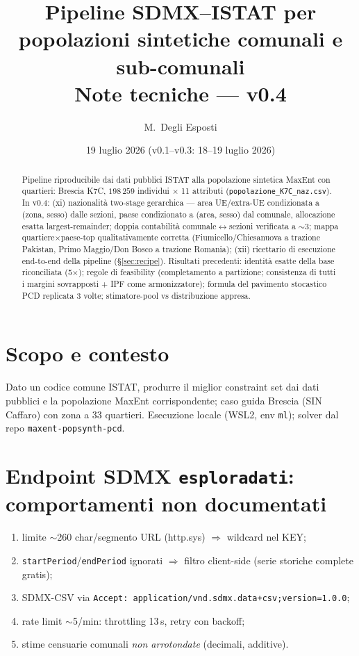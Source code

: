 \documentclass[11pt,a4paper]{article}
\title{\textbf{Pipeline SDMX--ISTAT per popolazioni sintetiche comunali e sub-comunali}\\[2mm]
\large Note tecniche --- v0.4}
\author{M.~Degli Esposti}
\date{19 luglio 2026 \quad (v0.1--v0.3: 18--19 luglio 2026)}
\newcommand{\code}[1]{\texttt{#1}}
\begin{document}
\maketitle

\begin{abstract}
\noindent
Pipeline riproducibile dai dati pubblici ISTAT alla popolazione sintetica
MaxEnt con quartieri: Brescia K7C, $198\,259$ individui $\times$ 11 attributi
(\code{popolazione\_K7C\_naz.csv}). In v0.4: (xi) nazionalit\`a two-stage
gerarchica --- area UE/extra-UE condizionata a (zona, sesso) dalle sezioni,
paese condizionato a (area, sesso) dal comunale, allocazione esatta
largest-remainder; doppia contabilit\`a comunale$\leftrightarrow$sezioni
verificata a $\sim3$\textperthousand; mappa quartiere$\times$paese-top
qualitativamente corretta (Fiumicello/Chiesanuova a trazione Pakistan,
Primo Maggio/Don Bosco a trazione Romania); (xii) ricettario di esecuzione
end-to-end della pipeline (\S\ref{sec:recipe}). Risultati precedenti:
identit\`a esatte della base riconciliata (5$\times$); regole di feasibility
(completamento a partizione; consistenza di tutti i margini sovrapposti + IPF
come armonizzatore); formula del pavimento stocastico PCD replicata 3 volte;
stimatore-pool vs distribuzione appresa.
\end{abstract}

\tableofcontents

\section{Scopo e contesto}
Dato un codice comune ISTAT, produrre il miglior constraint set dai dati
pubblici e la popolazione MaxEnt corrispondente; caso guida Brescia (SIN
Caffaro) con zona a 33 quartieri. Esecuzione locale (WSL2, env \code{ml});
solver dal repo \code{maxent-popsynth-pcd}.

\section{Endpoint SDMX \code{esploradati}: comportamenti non documentati}
\label{sec:quirks}
\begin{enumerate}[leftmargin=*,itemsep=1pt]
  \item limite $\sim$260 char/segmento URL (http.sys) $\Rightarrow$ wildcard nel KEY;
  \item \code{startPeriod}/\code{endPeriod} ignorati $\Rightarrow$ filtro client-side
  (serie storiche complete gratis);
  \item SDMX-CSV via \code{Accept: application/vnd.sdmx.data+csv;version=1.0.0};
  \item rate limit $\sim$5/min: throttling 13\,s, retry con backoff;
  \item stime censuarie comunali \emph{non arrotondate} (decimali, additive).
\end{enumerate}
\end{document}
